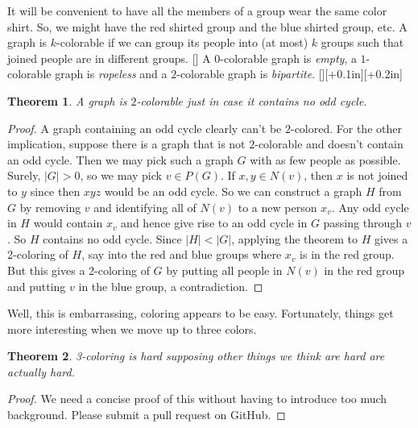 \documentclass{amsbook}
\newcommand{\aaside}[2]{\marginnote{\scriptsize{#1}}[#2]}
\theoremstyle{plain}
\newtheorem{theorem}{Theorem}
\numberwithin{equation}{chapter}
\begin{document}
It will be convenient to have all the members of a group wear the same color shirt.  So, we might have the red shirted group and the blue shirted group, etc.
A graph is $k$-colorable if we can group its people into (at most) $k$ groups such that joined people are in different groups. \aaside{$k$-colorable}{}
A $0$-colorable graph is \emph{empty}, a $1$-colorable graph is \emph{ropeless} and a $2$-colorable graph is \emph{bipartite}. \aaside{empty}{}\aaside{ropeless}{+0.1in}\aaside{bipartite}{+0.2in}
\begin{theorem}\label{TwoColoring}
A graph is $2$-colorable just in case it contains no odd cycle.
\end{theorem}
\begin{proof}
A graph containing an odd cycle clearly can't be $2$-colored.  For the other implication, suppose
there is a graph that is not $2$-colorable and doesn't contain an odd cycle.  Then we may pick such a graph $G$ with as few people as possible.
Surely, $|G| > 0$, so we may pick $v \in P(G)$.  If $x, y \in N(v)$, then $x$ is not joined to $y$ since then $xyz$ would be an odd cycle.
So we can construct a graph $H$ from $G$ by removing $v$ and identifying all of $N(v)$ to a new person $x_v$.  Any odd cycle
in $H$ would contain $x_v$ and hence give rise to an odd cycle in $G$ passing through $v$.  So $H$ contains no odd cycle. Since $|H| < |G|$, 
applying the theorem to $H$ gives a 2-coloring of $H$, say into the red and blue groups
where $x_v$ is in the red group.  But this gives a 2-coloring of $G$ by putting all people in $N(v)$ in the red group and putting $v$ in the blue group, a contradiction.
\end{proof}

Well, this is embarrassing, coloring appears to be easy.  Fortunately, things get more interesting when we move up to three colors.
\begin{theorem}
3-coloring is hard supposing other things we think are hard are actually hard.
\end{theorem}
\begin{proof}
We need a concise proof of this without having to introduce too much background.  Please submit a pull request on GitHub.
\end{proof}
\end{document}
